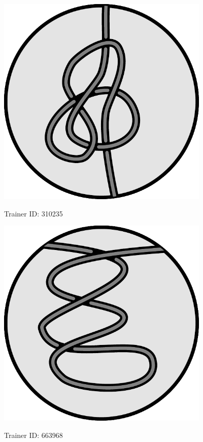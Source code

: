   \begin{center}
    \includegraphics[width=4in]{assets/knot3.pdf}

    \Huge Trainer ID: 310235 
%
%
%
  \end{center}

  \begin{center}
    \includegraphics[width=4in]{assets/unknot3.pdf}

    \Huge Trainer ID: 663968
%
  \end{center}
